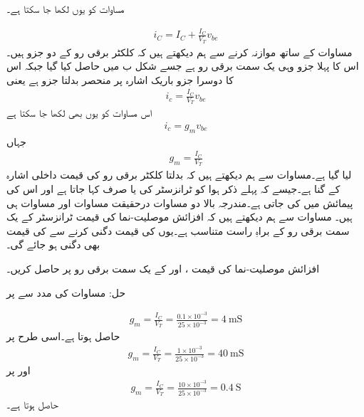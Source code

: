 



	مساوات   کو یوں لکھا جا سکتا ہے۔

\begin{align} \label{مساوات_ٹرانزسٹر_رو_کے_یکسمتی_اور_بدلتا_حصوں_کا_حصول}
i_C=I_C+\frac{I_C}{V_T} v_{be}
\end{align}
مساوات   کے ساتھ موازنہ کرنے سے ہم دیکھتے ہیں کہ کلکٹر  برقی رو   کے دو جزو ہیں۔اس کا پہلا جزو وہی یک سمت برقی رو  ہے جسے شکل   ب میں حاصل کیا گیا جبکہ اس کا دوسرا جزو    باریک اشارہ پر منحصر بدلتا جزو ہے یعنی
\begin{align} \label{مساوات_ٹرانزسٹر_رو_کے_بدلتے_حصے_کا_حصول}
i_c = \frac{I_C}{V_T} v_{be}
\end{align}
اس مساوات کو یوں بھی لکھا جا سکتا ہے
\begin{align} \label{مساوات_ٹرانزسٹر_اشارے_میں_اضافہ}
i_c = g_m v_{be}
\end{align}
جہاں
\begin{align} \label{مساوات_ٹرانزسٹر_افزائش_موصلیت_نما}
g_m =\frac{I_C}{V_T}
\end{align}
لیا گیا ہے۔مساوات   سے ہم دیکھتے ہیں کہ بدلتا کلکٹر  برقی رو   کی قیمت داخلی اشارہ  کے   گنا ہے۔جیسے کہ پہلے ذکر ہوا  کو ٹرانزسٹر کی   یا صرف   کہا جاتا ہے اور اس کی پیمائش   میں کی جاتی ہے۔مندرجہ بالا دو مساوات درحقیقت مساوات   اور مساوات    ہی ہیں۔
	مساوات   سے ہم دیکھتے ہیں کہ افزائش موصلیت-نما کی قیمت ٹرانزسٹر کے یک سمت برقی رو  کے براہِ راست متناسب ہے۔یوں  کی قیمت دگنی کرنے سے  کی قیمت بھی دگنی ہو جائے گی۔

افزائش موصلیت-نما کی قیمت ،  اور  کے یک سمت برقی رو پر حاصل کریں۔

حل:	مساوات   کی مدد سے  پر

\begin{align*}
g_m = \frac{I_C}{V_T}=\frac{0.1 \times 10^{-3}}{25 \times 10^{-3}}=\SI{4}{\milli \siemens}
\end{align*}
حاصل ہوتا ہے۔اسی طرح   پر
\begin{align*}
g_m = \frac{I_C}{V_T}=\frac{1 \times 10^{-3}}{25 \times 10^{-3}}=\SI{40}{\milli \siemens}
\end{align*}
اور   پر
\begin{align*}
g_m = \frac{I_C}{V_T}=\frac{10 \times 10^{-3}}{25 \times 10^{-3}}=\SI{0.4}{\siemens}
\end{align*}
حاصل ہوتا ہے۔

